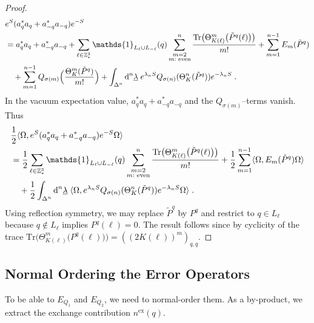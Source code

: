 \documentclass[12pt,a4paper]{article}
\numberwithin{equation}{section}
\newcommand{\1}{\mathbb{I}}
\newcommand{\di}{\textnormal{d}}
\newcommand{\ex}{\mathrm{ex}}
\newcommand{\Z}{\mathbb{Z}}
\newcommand{\half}{\frac{1}{2}}
\theoremstyle{plain}
\theoremstyle{definition}
\theoremstyle{remark}
\theoremstyle{plain}
\theoremstyle{definition}
\theoremstyle{remark}
\begin{document}
\begin{proof}
\begin{align}
	&e^{S} (a_q^* a_q + a_{-q}^* a_{-q}) e^{-S} \nonumber\\
	&= a_q^* a_q + a_{-q}^* a_{-q}
		+ \sum_{\ell\in \Z^3_*} \mathds{1}_{L_\ell \cup L_{-\ell}}(q) \sum_{\substack{m=2\\m:\textnormal{ even}}}^n \frac{\mathrm{Tr} \big(\Theta^m_{K(\ell)} \big( \tilde{P}^q(\ell) \big) \big)}{m!}
		+ \sum_{m=1}^{n-1} E_m(\tilde{P}^q) \nonumber\\
	&\quad+ \sum_{m=1}^{n-1}
		Q_{\sigma(m)} \Big( \frac{\Theta^m_{K}(\tilde{P}^q)}{m!} \Big)
		+\int_{\Delta^n} \di^n \underline{\lambda} \;
		e^{\lambda_n S}Q_{\sigma(n)}(\Theta^n_K (\tilde{P}^q)) e^{-\lambda_n S} \;.
\end{align}
In the vacuum expectation value, $ a_q^* a_q + a_{-q}^* a_{-q} $ and the $ Q_{\sigma(m)} $--terms vanish. Thus
\begin{align}
	& \half \langle \Omega, e^{S} (a_q^* a_q + a_{-q}^* a_{-q}) e^{-S} \Omega \rangle \nonumber\\
	&= \half \sum_{\ell\in \Z^3_*} \mathds{1}_{L_\ell \cup L_{-\ell}}(q) \sum_{\substack{m=2\\m:\textnormal{ even}}}^n \frac{\mathrm{Tr} \big(\Theta^m_{K(\ell)} \big( \tilde{P}^q(\ell) \big) \big)}{m!}
	+ \half \sum_{m=1}^{n-1} \langle \Omega, E_m(\tilde{P}^q) \Omega \rangle \nonumber\\
	&\quad + \half \int_{\Delta^n} \di^n \underline{\lambda} \;
		\langle \Omega, e^{\lambda_n S}Q_{\sigma(n)}(\Theta^n_{K}(\tilde{P}^q)) e^{-\lambda_n S} \Omega \rangle \;.
\end{align}
Using reflection symmetry, we may replace $ \tilde{P}^q $ by $ P^q $ and restrict to $ q \in L_\ell $ because $ q \notin L_\ell$ implies $P^q(\ell) = 0 $. The result follows since by cyclicity of the trace $ \mathrm{Tr} \big(\Theta^m_{K(\ell)} \big( P^q(\ell) \big) \big) = ((2K(\ell))^m)_{q,q} $.
\end{proof}






\subsection{Normal Ordering the Error Operators}
\label{sec:extraction_ex}

To be able to $ E_{Q_1} $ and $ E_{Q_2} $, we need to normal-order them. As a by-product, we extract the exchange contribution $ n^{\ex}(q) $.
\end{document}

